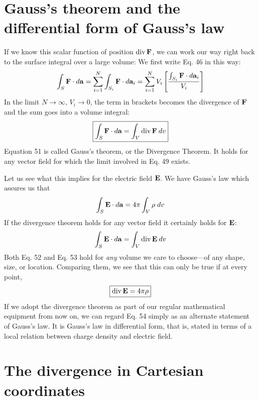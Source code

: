 \section{Gauss's theorem and the differential form of Gauss's law}

If we know this scalar function of position $\operatorname{div}\mathbf{F}$, we can work our
way right back to the surface integral over a large volume: We first
write Eq. 46 in this way:
\begin{equation}
  \int_S\mathbf{F}\cdot d\mathbf{a} = \sum_{i=1}^N\int_{S_i} \mathbf{F}\cdot d\mathbf{a}_i
           = \sum_{i=1}^N V_i \left[\frac{\int_{S_i} \mathbf{F}\cdot d\mathbf{a}_i}{V_i}\right]
\end{equation}
In the limit $N \rightarrow \infty$, $V_i\rightarrow0$, the term in brackets becomes the divergence
of $\mathbf{F}$ and the sum goes into a volume integral:
\begin{equation}
\boxed{
  \int_S\mathbf{F}\cdot d\mathbf{a} = \int_V \operatorname{div}\mathbf{F}\:d v
}
\end{equation}
Equation 51 is called Gauss's theorem, or the Divergence Theorem.
It holds for any vector field for which the limit involved in Eq. 49
exists.

Let us see what this implies for the electric field $\mathbf{E}$. We have
Gauss's law which assures us that
\begin{equation}
  \int_S\mathbf{E}\cdot d\mathbf{a} = 4\pi\int_V\rho\;d v
\end{equation}
If the divergence theorem holds for any vector field it certainly holds
for $\mathbf{E}$:
\begin{equation}
  \int_S\mathbf{E}\cdot d\mathbf{a} = \int_V \operatorname{div}\mathbf{E}\:d v
\end{equation}
Both Eq. 52 and Eq. 53 hold for \emph{any} volume we care to choose---of
any shape, size, or location. Comparing them, we see that this can
only be true if at every point,
\begin{equation}
\boxed{
  \operatorname{div}\mathbf{E} = 4\pi\rho
}
\end{equation}
If we adopt the divergence theorem as part of our regular mathematical
equipment from now on, we can regard Eq. 54 simply as an alternate
statement of Gauss's law. It is Gauss's law in differential form,
that is, stated in terms of a local relation between charge density and
electric field.

\section{The divergence in Cartesian coordinates}

